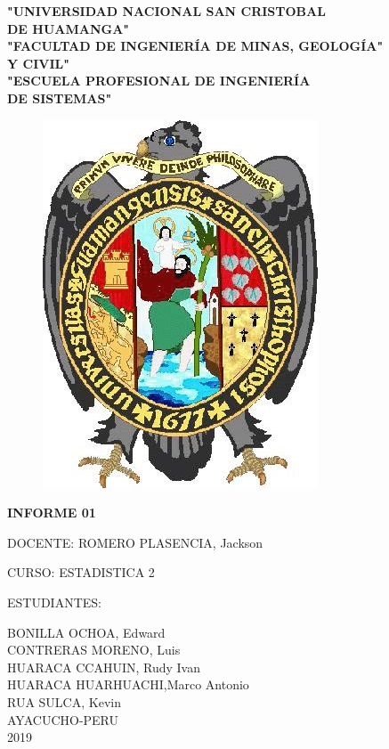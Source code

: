 \documentclass[10pt,a4paper]{article}
\begin{document}
\bfseries \centering "UNIVERSIDAD NACIONAL SAN CRISTOBAL\\
\bfseries \centering DE HUAMANGA"\\
\bfseries \centering "FACULTAD DE INGENIERÍA DE MINAS, GEOLOGÍA"\\
\bfseries \centering Y CIVIL"\\
\bfseries \centering "ESCUELA PROFESIONAL DE INGENIERÍA\\
\bfseries \centering DE SISTEMAS"\\
\begin{figure}[h!]
	\centering \includegraphics{unsch}
\end{figure}
\bfseries \centering INFORME 01\\[0.3cm]
\begin{flushleft}
	DOCENTE: ROMERO PLASENCIA, Jackson
\end{flushleft} 
\begin{flushleft}
	CURSO: ESTADISTICA 2
\end{flushleft}
\begin{flushleft}
	ESTUDIANTES:
\end{flushleft}
BONILLA OCHOA, Edward\\
CONTRERAS MORENO, Luis\\
HUARACA CCAHUIN, Rudy Ivan\\
HUARACA HUARHUACHI,Marco Antonio\\
RUA SULCA, Kevin\\[5cm]

AYACUCHO-PERU\\
2019
	
\end{document}
